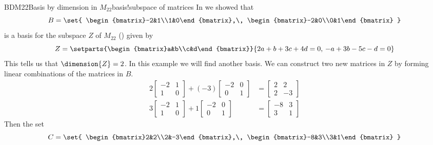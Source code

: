\begin{example}{BDM22}{Basis by dimension in $M_{22}$}{basis!subspace of matrices}
In  we showed that
%
\begin{equation*}
B=
\set{
\begin{bmatrix}-2&1\\1&0\end{bmatrix},\,
\begin{bmatrix}-2&0\\0&1\end{bmatrix}
}
\end{equation*}
%
is a basis for the subspace $Z$ of $M_{22}$ () given by
%
\begin{equation*}
Z=\setparts{\begin{bmatrix}a&b\\c&d\end{bmatrix}}{2a+b+3c+4d=0,\,-a+3b-5c-d=0}
\end{equation*}
%
This tells us that $\dimension{Z}=2$.  In this example we will find another basis.  We can construct two new matrices in $Z$ by forming linear combinations of the matrices in $B$.
%
\begin{align*}
    2\begin{bmatrix}-2&1\\1&0\end{bmatrix}+
 (-3)\begin{bmatrix}-2&0\\0&1\end{bmatrix}&=
 \begin{bmatrix}2&2\\2&-3\end{bmatrix}\\
3\begin{bmatrix}-2&1\\1&0\end{bmatrix}+
 1\begin{bmatrix}-2&0\\0&1\end{bmatrix}&=
\begin{bmatrix}-8&3\\3&1\end{bmatrix}
\end{align*}
%
Then the set
%
\begin{equation*}
C=
\set{
\begin{bmatrix}2&2\\2&-3\end{bmatrix},\,
\begin{bmatrix}-8&3\\3&1\end{bmatrix}
}
\end{equation*}
\end{example}
